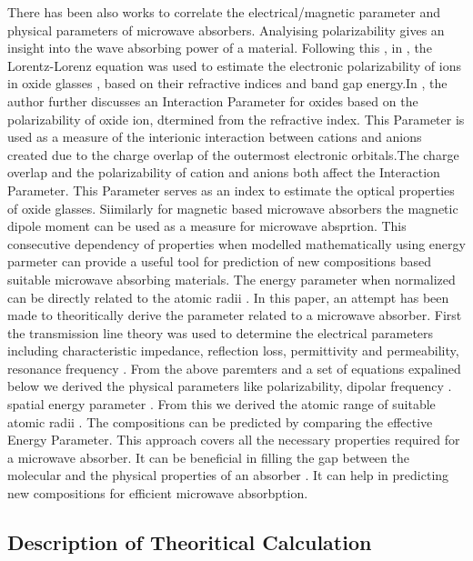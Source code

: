 \documentclass[journal]{IEEEtran}
\begin{document}
There has been also works to correlate the electrical/magnetic parameter and physical parameters of microwave absorbers. Analyising polarizability gives an insight into the wave absorbing power of a material. Following this , in \cite{Erbium} , the Lorentz-Lorenz equation was used to estimate  the electronic polarizability of ions in oxide glasses , based on their refractive indices and band gap energy.In \cite{dimitrov1999effect} , the author further discusses an Interaction Parameter for oxides based  on the polarizability of oxide ion, dtermined from the refractive index. This Parameter is used as a measure of the interionic interaction between cations and anions created due to the charge overlap of the outermost electronic orbitals.The charge overlap and the polarizability of cation and anions both affect the Interaction Parameter. This Parameter serves as an index to estimate the optical  properties of oxide glasses. Siimilarly for magnetic based microwave absorbers the magnetic dipole moment can be used as a measure for microwave absprtion.  This consecutive dependency of  properties when modelled mathematically using energy parmeter can provide a useful tool for prediction of new compositions based suitable microwave absorbing materials. The energy parameter when normalized can be directly related to the atomic radii \cite{korablev2018calculations}.
In this paper, an attempt has been made to theoritically derive the parameter related to a microwave absorber. First the transmission line theory was used to determine the electrical parameters including characteristic impedance, reflection loss, permittivity and permeability, resonance frequency . From the above paremters and a set of equations expalined below we derived  the physical parameters like polarizability, dipolar frequency . spatial energy parameter . From this we derived   the atomic range of suitable atomic radii . The compositions can be predicted by comparing the effective Energy Parameter. This approach covers all the necessary  properties required for a microwave absorber. It can be beneficial in filling the gap between the molecular and the physical properties of an absorber . It can help in predicting new compositions for efficient microwave absorbption.
\newline
\subsection{Description of Theoritical Calculation}
\end{document}
